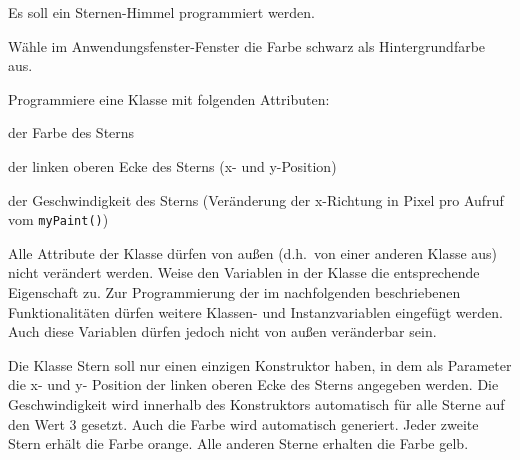 Es soll ein Sternen-Himmel programmiert werden.

\begin{compactenum}[a)]
\item Wähle im Anwendungsfenster-Fenster die Farbe schwarz als
Hintergrundfarbe aus.

\item Programmiere eine Klasse  mit folgenden Attributen:

\begin{compactitem}
\item der Farbe des Sterns
\item der linken oberen Ecke des Sterns (x- und y-Position)
\item der Geschwindigkeit des Sterns (Veränderung der x-Richtung in Pixel pro
Aufruf vom \lstinline|myPaint()|)
\end{compactitem}

Alle Attribute der Klasse dürfen von außen (d.h.\ von einer anderen Klasse aus)
nicht verändert werden. Weise den Variablen in der Klasse die entsprechende
Eigenschaft zu. Zur Programmierung der im nachfolgenden beschriebenen
Funktionalitäten dürfen weitere Klassen- und Instanzvariablen eingefügt werden.
Auch diese Variablen dürfen jedoch nicht von außen veränderbar sein.

Die Klasse Stern soll nur einen einzigen Konstruktor haben, in dem als
Parameter die x- und y- Position der linken oberen Ecke des Sterns angegeben
werden. Die Geschwindigkeit wird innerhalb des Konstruktors automatisch für
alle Sterne auf den Wert 3 gesetzt. Auch die Farbe wird automatisch generiert.
Jeder zweite Stern erhält die Farbe orange. Alle anderen Sterne erhalten die
Farbe gelb.

\vspace{1mm}


\end{compactenum}

